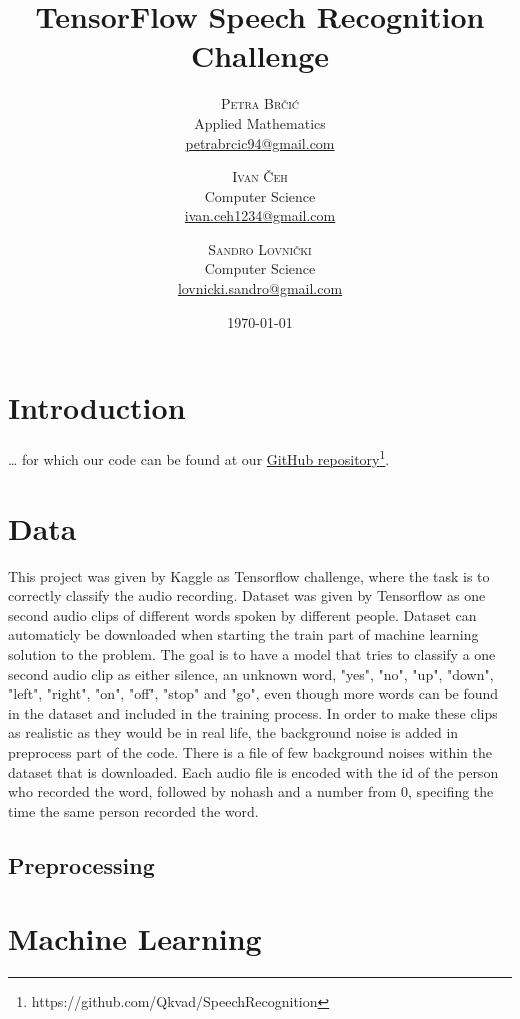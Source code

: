 \documentclass[twoside]{article}
\title{TensorFlow Speech Recognition Challenge} %
\author{%
\textsc{Petra Br\v{c}i\'c}\\%
\normalsize Applied Mathematics \\
\normalsize \href{mailto:petrabrcic94@gmail.com}{petrabrcic94@gmail.com} 
\and
\textsc{Ivan \v{C}eh}\\%
\normalsize Computer Science \\
\normalsize \href{mailto:ivan.ceh1234@gmail.com}{ivan.ceh1234@gmail.com} 
\and
\textsc{Sandro Lovni\v{c}ki}\\%
\normalsize Computer Science \\ 
\normalsize \href{mailto:lovnicki.sandro@gmail.com}{lovnicki.sandro@gmail.com}
}
\date{\today}
\begin{document}
\maketitle
\tableofcontents
\newpage

\begin{multicols}{2}

\section{Introduction}

\ldots
for which our code can be found at our \hyperref[https://github.com/Qkvad/3rdOrderTensors]{GitHub repository}\footnote{https://github.com/Qkvad/SpeechRecognition}.

\section{Data}
This project was given by Kaggle as Tensorflow challenge, where the task is to correctly classify the audio recording. Dataset was given by Tensorflow as one second audio clips of different words spoken by different people. Dataset can automaticly be downloaded when starting the train part of machine learning solution to the problem. 
The goal is to have a model that tries to classify a one second audio clip as either silence, an unknown word, "yes", "no", "up", "down", "left", "right", "on", "off", "stop" and "go", even though more words can be found in the dataset and included in the training process. In order to make these clips as realistic as they would be in real life, the background noise is added in preprocess part of the code. There is a file of few background noises within the dataset that is downloaded. 
Each audio file is encoded with the id of the person who recorded the word, followed by nohash and a number from 0, specifing the time the same person recorded the word.  
\subsection{Preprocessing}

\section{Machine Learning}


\end{multicols}
\end{document}
